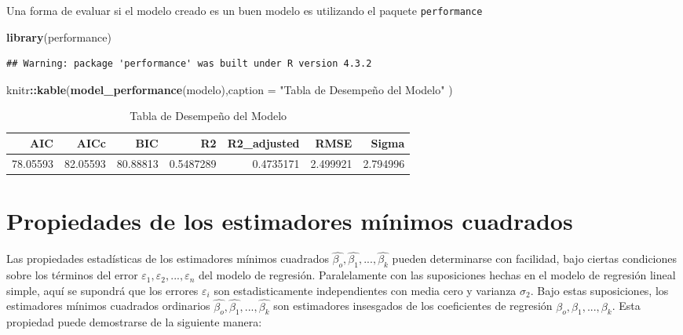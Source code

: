 \documentclass[
]{book}
\newenvironment{Shaded}{\begin{snugshade}}{\end{snugshade}}
\newcommand{\AttributeTok}[1]{\textcolor[rgb]{0.13,0.29,0.53}{#1}}
\newcommand{\FunctionTok}[1]{\textcolor[rgb]{0.13,0.29,0.53}{\textbf{#1}}}
\newcommand{\NormalTok}[1]{#1}
\newcommand{\SpecialCharTok}[1]{\textcolor[rgb]{0.81,0.36,0.00}{\textbf{#1}}}
\newcommand{\StringTok}[1]{\textcolor[rgb]{0.31,0.60,0.02}{#1}}
\begin{document}
Una forma de evaluar si el modelo creado es un buen modelo es utilizando el paquete \texttt{performance}

\begin{Shaded}
\begin{Highlighting}[]
\FunctionTok{library}\NormalTok{(performance)}
\end{Highlighting}
\end{Shaded}

\begin{verbatim}
## Warning: package 'performance' was built under R version 4.3.2
\end{verbatim}

\begin{Shaded}
\begin{Highlighting}[]
\NormalTok{knitr}\SpecialCharTok{::}\FunctionTok{kable}\NormalTok{(}\FunctionTok{model\_performance}\NormalTok{(modelo),}\AttributeTok{caption =} \StringTok{"Tabla de Desempeño del Modelo"}\NormalTok{ )}
\end{Highlighting}
\end{Shaded}

\begin{table}

\caption{\label{tab:performance}Tabla de Desempeño del Modelo}
\centering
\begin{tabular}[t]{r|r|r|r|r|r|r}
\hline
AIC & AICc & BIC & R2 & R2\_adjusted & RMSE & Sigma\\
\hline
78.05593 & 82.05593 & 80.88813 & 0.5487289 & 0.4735171 & 2.499921 & 2.794996\\
\hline
\end{tabular}
\end{table}

\hypertarget{propiedades-de-los-estimadores-muxednimos-cuadrados}{%
\section{Propiedades de los estimadores mínimos cuadrados}\label{propiedades-de-los-estimadores-muxednimos-cuadrados}}

Las propiedades estadísticas de los estimadores mínimos cuadrados \(\hat{\beta_{o}},\hat{\beta_{1}},...,\hat{\beta_{k}}\) pueden determinarse con facilidad, bajo ciertas condiciones sobre los términos del error \(\varepsilon_{1},\varepsilon_{2},...,\varepsilon_{n}\) del modelo de regresión. Paralelamente con las suposiciones hechas en el modelo de regresión lineal simple, aquí se supondrá que los errores \(\varepsilon_{i}\) son estadisticamente independientes con media cero y varianza \(\sigma_{2}\). Bajo estas suposiciones, los estimadores mínimos cuadrados ordinarios \(\hat{\beta_{o}},\hat{\beta_{1}},...,\hat{\beta_{k}}\) son estimadores insesgados de los coeficientes de regresión \(\beta_{o},\beta_{1},...,\beta_{k}\). Esta propiedad puede demostrarse de la siguiente manera:
\end{document}
